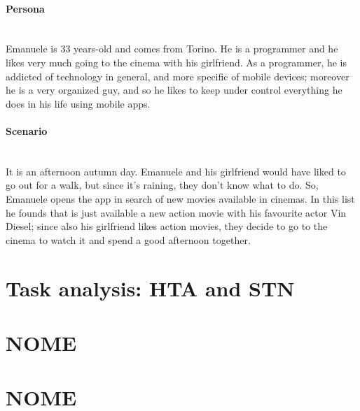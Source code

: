 \documentclass[12pt, a4paper]{article}
\begin{document}
\paragraph{Persona}\mbox{}\\
Emanuele is 33 years-old and comes from Torino. He is a programmer and he likes 
very much going to the cinema with his girlfriend. 
As a programmer, he is addicted of technology in general, and more specific of mobile 
devices; moreover he is a very organized guy, and so he likes to keep under control 
everything he does in his life using mobile apps.

\paragraph{Scenario}\mbox{}\\
It is an afternoon autumn day. Emanuele and his girlfriend would have liked to go 
out for a walk, but since it’s raining, they don’t know what to do. So, Emanuele opens 
the app in search of new movies available in cinemas. In this list he founds that is just 
available a new action movie with his favourite actor Vin Diesel; since also his 
girlfriend likes action movies, they decide to go to the cinema to watch it and spend 
a good afternoon together.


\newpage

\section{Task analysis: HTA and STN}


\newpage

\section*{NOME}


\newpage

\section*{NOME}

\end{document}
